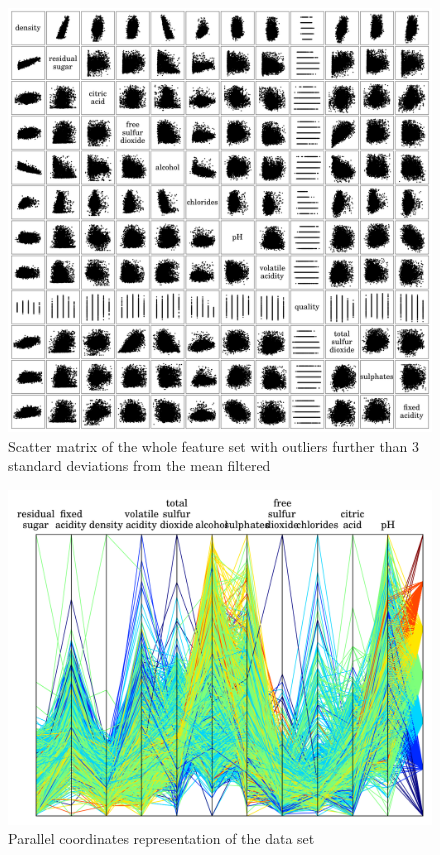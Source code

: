 \documentclass{report}
\begin{document}
\begin{figure}[H]
\includegraphics[width=\textwidth]{scattermatrix_filtered.png}
\caption{Scatter matrix of the whole feature set with outliers further than 3 standard deviations from the mean filtered}
\end{figure}

\begin{figure}[H]
\includegraphics[width=\textwidth]{parallel_coords.png}
\caption{Parallel coordinates representation of the data set}
\end{figure}
\end{document}
